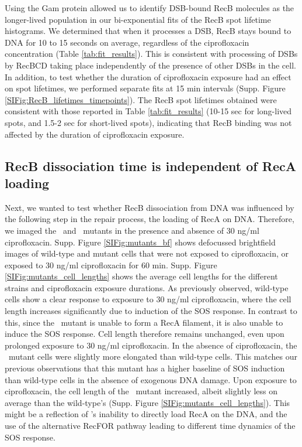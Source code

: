 Using the Gam protein allowed us to identify DSB-bound RecB molecules as the longer-lived population in our bi-exponential fits of the RecB spot lifetime histograms. We determined that when it processes a DSB, RecB stays bound to DNA for 10 to 15 seconds on average, regardless of the ciprofloxacin concentration (Table \ref{tab:fit_results}). This is consistent with processing of DSBs by RecBCD taking place independently of the presence of other DSBs in the cell. In addition, to test whether the duration of ciprofloxacin exposure had an effect on spot lifetimes, we performed separate fits at 15 min intervals (Supp. Figure \ref{SIFig:RecB_lifetimes_timepoints}). The RecB spot lifetimes obtained were consistent with those reported in Table \ref{tab:fit_results} (10-15 sec for long-lived spots, and 1.5-2 sec for short-lived spots), indicating that RecB binding was not affected by the duration of ciprofloxacin exposure.

\subsection*{RecB dissociation time is independent of RecA loading}

Next, we wanted to test whether RecB dissociation from DNA was influenced by the following step in the repair process, the loading of RecA on DNA. Therefore, we imaged the \dreca\ and \geneteneighty\ mutants in the presence and absence of 30 ng/ml ciprofloxacin. Supp. Figure \ref{SIFig:mutants_bf} shows defocussed brightfield images of wild-type and mutant cells that were not exposed to ciprofloxacin, or exposed to 30 ng/ml ciprofloxacin for 60 min. Supp. Figure \ref{SIFig:mutants_cell_lengths} shows the average cell lengths for the different strains and ciprofloxacin exposure durations. As previously observed, wild-type cells show a clear response to exposure to 30 ng/ml ciprofloxacin, where the cell length increases significantly due to induction of the SOS response. In contrast to this, since the \dreca\ mutant is unable to form a RecA filament, it is also unable to induce the SOS response. Cell length therefore remains unchanged, even upon prolonged exposure to 30 ng/ml ciprofloxacin. In the absence of ciprofloxacin, the \geneteneighty\ mutant cells were slightly more elongated than wild-type cells. This matches our previous observations that this mutant has a higher baseline of SOS induction than wild-type cells in the absence of exogenous DNA damage\cite{Lepore2023}. Upon exposure to ciprofloxacin, the cell length of the \geneteneighty\ mutant increased, albeit slightly less on average than the wild-type's (Supp. Figure \ref{SIFig:mutants_cell_lengths}). This might be a reflection of \teneighty's inability to directly load RecA on the DNA, and the use of the alternative RecFOR pathway leading to different time dynamics of the SOS response\cite{Ivancic-Bace_2003,Lepore2023}.


